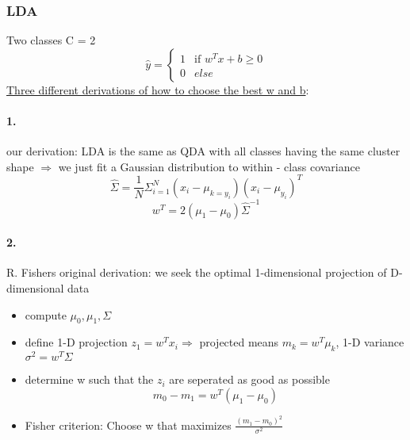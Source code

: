 \documentclass[11pt]{article}
\begin{document}
      \subsubsection{LDA}
      Two classes C = 2
      \begin{equation*}
        \hat{y} = \begin{cases}
        1 & \text{if } w^Tx + b \geq 0 \\
        0 & else
        \end{cases}
      \end{equation*}
      \underline{Three different derivations of how to choose the best w and b}: \\
      \paragraph{1.}
        our derivation: LDA is the same as QDA with all classes having the same
        cluster shape $\Rightarrow$ we just fit a Gaussian distribution to within - class
        covariance
        \begin{equation*}
          \hat{\Sigma} = \frac{1}{N} \Sigma_{i=1}^{N} (x_{i} - \mu_{k = y_{i}}) ( x_{i} - \mu_{y_{i}})^T
        \end{equation*}
        \begin{equation*}
          w^T = 2(\mu_{1} - \mu_{0}) \hat{\Sigma}^{-1}
        \end{equation*}
      \paragraph{2.}
        R. Fishers original derivation: we seek the optimal 1-dimensional
        projection of D-dimensional data
        \begin{itemize}
          \item compute $\mu_{0}, \mu_{1}, \Sigma$
          \item define 1-D projection $z_{1} = w^Tx_{i} \Rightarrow$ projected
          means $m_{k} = w^T\mu_{k}$, 1-D variance $\sigma^2 = w^T\Sigma$
          \item determine w such that the $z_{i}$ are seperated as good as possible
          \begin{equation*}
            m_{0} - m_{1} = w^T(\mu_{1} - \mu_{0})
          \end{equation*}
          \item Fisher criterion: Choose w that maximizes $\frac{(m_{1} - m_{0})^2}{\sigma^2}$
        \end{itemize}
\end{document}
